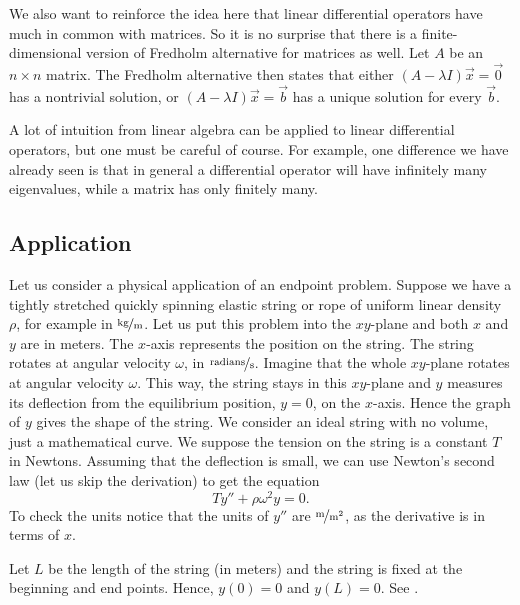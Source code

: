 We also want to reinforce the idea here that linear differential operators have
much in common with matrices.  So it is no surprise that
there is a finite-dimensional version of Fredholm alternative for matrices as
well.  Let $A$ be an $n \times n$ matrix.  The Fredholm alternative then
states that either $(A-\lambda I) \vec{x}
= \vec{0}$ has a nontrivial solution, or $(A-\lambda I) \vec{x} = \vec{b}$
has a unique solution for every $\vec{b}$.

A lot of intuition from linear algebra can be applied to linear differential
operators, but one must be careful of course.  For example, one 
difference we have already seen is that in general a differential operator
will have infinitely many eigenvalues, while a matrix has only finitely many.

\subsection{Application}

Let us consider a physical application of an endpoint problem.
Suppose we have a tightly stretched quickly spinning elastic
string or rope of uniform linear density $\rho$, for example in
$\unitfrac{kg}{m}$.
Let us put this problem into the $xy$-plane and both $x$ and $y$
are in meters.  The $x$-axis represents the
position on the string.  The string rotates at angular velocity $\omega$,
in $\unitfrac{radians}{s}$.
Imagine that the whole $xy$-plane rotates at angular velocity $\omega$.
This way, the string stays in this $xy$-plane and $y$ 
measures its deflection from the equilibrium position, $y=0$, on the $x$-axis.
Hence the graph of $y$ gives the shape of the string.
We consider an ideal string with
no volume, just a mathematical curve.
We suppose the tension on the string is a constant $T$ in Newtons.
Assuming that the deflection is small,
we can use Newton's second law (let us skip the derivation) to get the equation
\begin{equation*}
T y'' + \rho \omega^2 y = 0 .
\end{equation*}
To check the units notice that the units of $y''$ are $\unitfrac{m}{m^2}$, as the derivative is
in terms of $x$.

Let $L$ be the length of the string (in meters) and the string
is fixed at the beginning and end
points.  Hence, $y(0) = 0$ and $y(L) = 0$.  See
.

